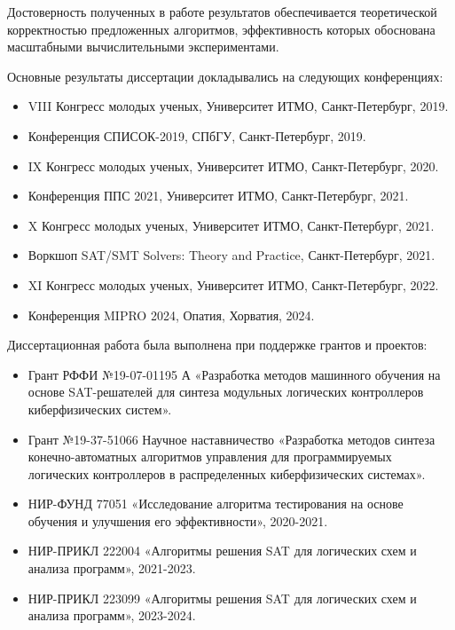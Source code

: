 {\reliability}
%
Достоверность полученных в работе результатов обеспечивается теоретической корректностью предложенных алгоритмов, эффективность которых обоснована масштабными вычислительными экспериментами.


\probation
%
Основные результаты диссертации докладывались на следующих конференциях:
\begin{itemize}[beginpenalty=10000]
    \item VIII Конгресс молодых ученых, Университет ИТМО, Санкт-Петербург, 2019.
    \item Конференция СПИСОК-2019, СПбГУ, Санкт-Петербург, 2019.
    \item IX Конгресс молодых ученых, Университет ИТМО, Санкт-Петербург, 2020.
    \item Конференция ППС 2021, Университет ИТМО, Санкт-Петербург, 2021.
    \item X Конгресс молодых ученых, Университет ИТМО, Санкт-Петербург, 2021.
    \item Воркшоп SAT/SMT Solvers: Theory and Practice, Санкт-Петербург, 2021.
    \item XI Конгресс молодых ученых, Университет ИТМО, Санкт-Петербург, 2022.
    \item Конференция MIPRO 2024, Опатия, Хорватия, 2024.
\end{itemize}

Диссертационная работа была выполнена при поддержке грантов и проектов:
\begin{itemize}[beginpenalty=10000]
    \item Грант РФФИ №19-07-01195 А «Разработка методов машинного обучения на основе SAT-решателей для синтеза модульных логических контроллеров киберфизических систем».
    \item Грант №19-37-51066 Научное наставничество «Разработка методов синтеза конечно-автоматных алгоритмов управления для программируемых логических контроллеров в распределенных киберфизических системах».
    \item НИР-ФУНД 77051 «Исследование алгоритма тестирования на основе обучения и улучшения его эффективности», 2020-2021.
    \item НИР-ПРИКЛ 222004 «Алгоритмы решения SAT для логических схем и анализа программ», 2021-2023.
    \item НИР-ПРИКЛ 223099 «Алгоритмы решения SAT для логических схем и анализа программ», 2023-2024.
\end{itemize}


